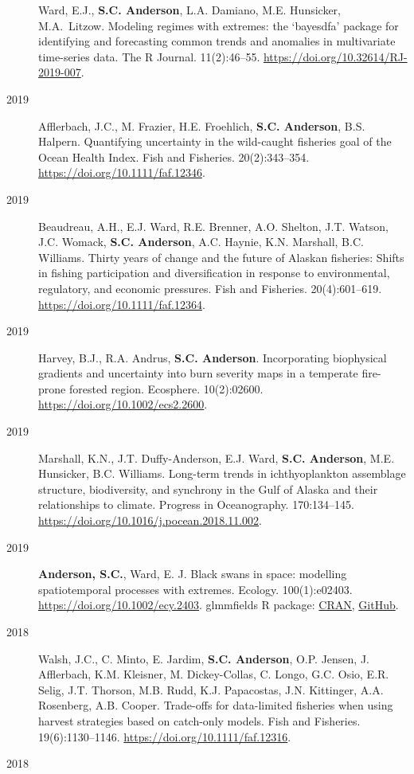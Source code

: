 \begin{description}
Ward, E.J., \textbf{S.C. Anderson}, L.A. Damiano, M.E. Hunsicker,
M.A.\ Litzow. Modeling regimes with extremes: the `bayesdfa' package for
identifying and forecasting common trends and anomalies in multivariate
time-series data. The R Journal. 11(2):46--55.
\url{https://doi.org/10.32614/RJ-2019-007}.
\item[2019]
Afflerbach, J.C., M. Frazier, H.E. Froehlich, \textbf{S.C. Anderson},
B.S. Halpern. Quantifying uncertainty in the wild-caught fisheries goal
of the Ocean Health Index. Fish and Fisheries. 20(2):343--354.
\url{https://doi.org/10.1111/faf.12346}.
\item[2019]
Beaudreau, A.H., E.J. Ward, R.E. Brenner, A.O. Shelton, J.T. Watson,
J.C. Womack, \textbf{S.C. Anderson}, A.C. Haynie, K.N. Marshall, B.C.
Williams. Thirty years of change and the future of Alaskan fisheries:
Shifts in fishing participation and diversification in response to
environmental, regulatory, and economic pressures. Fish and Fisheries.
20(4):601--619. \url{https://doi.org/10.1111/faf.12364}.
\item[2019]
Harvey, B.J., R.A. Andrus, \textbf{S.C. Anderson}. Incorporating
biophysical gradients and uncertainty into burn severity maps in a
temperate fire-prone forested region. Ecosphere. 10(2):02600.
\url{https://doi.org/10.1002/ecs2.2600}.
\item[2019]
Marshall, K.N., J.T. Duffy-Anderson, E.J. Ward, \textbf{S.C. Anderson},
M.E. Hunsicker, B.C. Williams. Long-term trends in ichthyoplankton
assemblage structure, biodiversity, and synchrony in the Gulf of Alaska
and their relationships to climate. Progress in Oceanography.
170:134--145. \url{https://doi.org/10.1016/j.pocean.2018.11.002}.
\item[2019]
\textbf{Anderson, S.C.}, Ward, E. J. Black swans in space: modelling
spatiotemporal processes with extremes. Ecology. 100(1):e02403.
\url{https://doi.org/10.1002/ecy.2403}. glmmfields R package:
\href{https://cran.r-project.org/package=glmmfields}{CRAN},
\href{https://github.com/seananderson/glmmfields}{GitHub}.
\item[2018]
Walsh, J.C., C. Minto, E. Jardim, \textbf{S.C. Anderson}, O.P. Jensen,
J. Afflerbach, K.M. Kleisner, M. Dickey-Collas, C. Longo, G.C. Osio,
E.R. Selig, J.T. Thorson, M.B. Rudd, K.J. Papacostas, J.N. Kittinger,
A.A. Rosenberg, A.B. Cooper. Trade-offs for data-limited fisheries when
using harvest strategies based on catch-only models. Fish and Fisheries.
19(6):1130--1146. \url{https://doi.org/10.1111/faf.12316}.
\item[2018]

\end{description}
